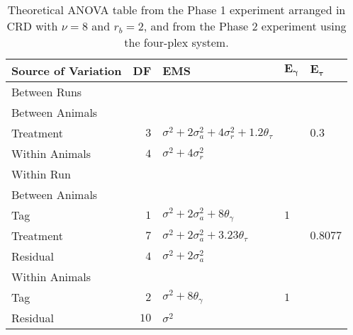 \begin{table}[!ht]
\centering
 \caption{Theoretical ANOVA table from the Phase 1 experiment arranged in CRD with $\nu = 8$ and $r_b = 2$, and from the Phase 2 experiment using the four-plex system.}
 \begin{tabular}[t]{lrlll} 
 \toprule 
 \multicolumn{1}{l}{\textbf{Source of Variation}} & \multicolumn{1}{l}{\textbf{DF}} & \multicolumn{1}{l}{\textbf{EMS}}& \multicolumn{1}{l}{$\bm{E_{\gamma}}$}&\multicolumn{1}{l}{$\bm{E_{\tau}}$}\\ 
 \midrule 
 Between Runs &  &  & & \\ 
 \quad Between Animals &  &  & & \\ 
 \quad \quad Treatment & $3$ & $\sigma^2+2\sigma_{a}^2+4\sigma_{r}^2+1.2\theta_{\tau}$ & & $0.3$\\ 
 \quad Within Animals & $4$ & $\sigma^2+4\sigma_{r}^2$ & & \\ \hline 
 Within Run &  &  & & \\ 
 \quad Between Animals &  &  & & \\ 
 \quad \quad Tag & $1$ & $\sigma^2+2\sigma_{a}^2+8\theta_{\gamma}$ &$1$ & \\ 
 \quad \quad Treatment & $7$ & $\sigma^2+2\sigma_{a}^2+ 3.23\theta_{\tau}$ & & $0.8077$\\ 
 \quad \quad Residual & $4$ & $\sigma^2+2\sigma_{a}^2$ & & \\ \hline 
 \quad Within Animals &  &  & & \\ 
 \quad \quad Tag & $2$ & $\sigma^2+8\theta_{\gamma}$ &$1$ & \\ 
 \quad \quad Residual & $10$ & $\sigma^2$ & & \\ 
 \bottomrule 
 \end{tabular} 
 \label{tab:EDFDiscuss1}
\end{table} 

